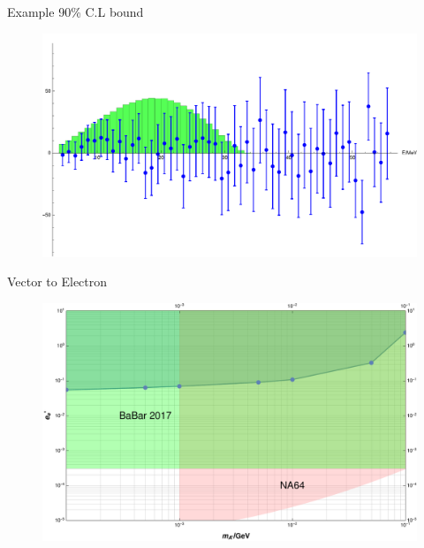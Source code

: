 \documentclass[11pt]{beamer}
\numberwithin{equation}{section}
\begin{document}
\begin{frame}{Example 90\% C.L bound}
\begin{figure}[H]
  \centering
    \includegraphics[width=\textwidth]{../imgs/PionExamplePlot}
\end{figure}
\end{frame}

\begin{frame}{Vector to Electron}
\begin{figure}[H]
  \centering
    \includegraphics[width=\textwidth]{../imgs/PionSpectrumVector}
\end{figure}
\end{frame}
\end{document}
